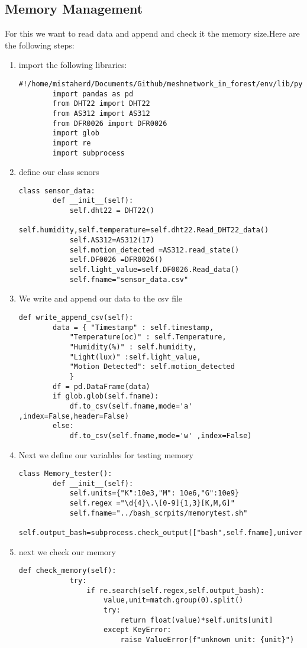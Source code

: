 \subsection{Memory Management}
For this we want to  read data  and append and check it the memory size.Here are the following steps:
\begin{enumerate}
    \item  import the following  libraries:
    \begin{lstlisting}[style=mystyle]
        #!/home/mistaherd/Documents/Github/meshnetwork_in_forest/env/lib/python3.11
        import pandas as pd
        from DHT22 import DHT22
        from AS312 import AS312
        from DFR0026 import DFR0026
        import glob
        import re 
        import subprocess
    \end{lstlisting}
    \item define our class  senors
    \begin{lstlisting}[style=mystyle]
    class sensor_data:
        def __init__(self):
            self.dht22 = DHT22()
            self.humidity,self.temperature=self.dht22.Read_DHT22_data()
            self.AS312=AS312(17)
            self.motion_detected =AS312.read_state()
            self.DF0026 =DFR0026()
            self.light_value=self.DF0026.Read_data()
            self.fname="sensor_data.csv"
    \end{lstlisting}
    \item We write and append our data to  the csv file
    \begin{lstlisting}[style=mystyle]
        def write_append_csv(self):
		data = { "Timestamp" : self.timestamp,
			"Temperature(oc)" : self.Temperature,
			"Humidity(%)" : self.humidity,
			"Light(lux)" :self.light_value,
			"Motion Detected": self.motion_detected
			}
		df = pd.DataFrame(data)
		if glob.glob(self.fname):	
			df.to_csv(self.fname,mode='a' ,index=False,header=False)
		else:
			df.to_csv(self.fname,mode='w' ,index=False)
    \end{lstlisting}
    \newpage
    \item Next we define our variables for testing  memory
    \begin{lstlisting}[style=mystyle]
    class Memory_tester():
        def __init__(self):
            self.units={"K":10e3,"M": 10e6,"G":10e9}
            self.regex ="\d{4}\.\[0-9]{1,3}[K,M,G]"
            self.fname="../bash_scrpits/memorytest.sh" 
            self.output_bash=subprocess.check_output(["bash",self.fname],universal_newlines=True)
    \end{lstlisting}
    \item next we check our memory
    \begin{lstlisting}[style=mystyle]
        def check_memory(self):
            try:
                if re.search(self.regex,self.output_bash):
                    value,unit=match.group(0).split()
                    try:
                        return float(value)*self.units[unit]
                    except KeyError:
                        raise ValueError(f"unknown unit: {unit}")
                

\end{lstlisting}
\end{enumerate}
